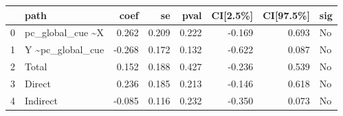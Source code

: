 \begin{tabular}{llrrrrrl}
\toprule
{} &               path &   coef &     se &   pval &  CI[2.5\%] &  CI[97.5\%] & sig \\
\midrule
0 &  pc\_global\_cue \textasciitilde  X &  0.262 &  0.209 &  0.222 &    -0.169 &      0.693 &  No \\
1 &  Y \textasciitilde  pc\_global\_cue & -0.268 &  0.172 &  0.132 &    -0.622 &      0.087 &  No \\
2 &              Total &  0.152 &  0.188 &  0.427 &    -0.236 &      0.539 &  No \\
3 &             Direct &  0.236 &  0.185 &  0.213 &    -0.146 &      0.618 &  No \\
4 &           Indirect & -0.085 &  0.116 &  0.232 &    -0.350 &      0.073 &  No \\
\bottomrule
\end{tabular}
